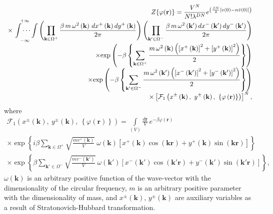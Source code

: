 \documentclass[aps,pre,preprint,floatfix,twoside,tightenlines,showpacs,
showkeys]{revtex4}
\begin{document}
\begin{equation}
\label{Z}
\begin{array}{r}
{\displaystyle 
Z{\left\{  \varphi(\mathbf{r})\right\} } = \frac{V^{N}}{N!\lambda^{DN}}e^{\left( \frac{\beta N}{2} \left[v(0) - n\tilde{v}(0) \right] \right)}
}\\
\times\ {\displaystyle 
\idotsint\limits_{-\infty}^{+\infty} \left(\prod_{\mathbf{k}\in\Omega^{+}} \frac{\beta\, m\, \omega^{2}\left(\mathbf{k}\right)\,dx^{+}\left(\mathbf{k}\right)dy^{+} \left(\mathbf{k}\right)}{2\pi}\right) \left(\prod_{\mathbf{k}'\in\Omega^{-}} \frac{\beta\, m\, \omega^{2}\left(\mathbf{k}'\right)dx^{-}\left(\mathbf{k}'\right)dy^{-} \left(\mathbf{k}'\right)}{2\pi}\right)
}\\
{\displaystyle 
\times {\exp\left(- \beta \left\{ \sum_{\mathbf{k}\in\Omega^+}\frac{ m\, \omega^{2}\left(\mathbf{k}\right)\left(\left[x^{+} \left(\mathbf{k}\right)\right]^{2} + \left[y^{+}\left(\mathbf{k}\right)\right]^{2}\right)}{2} \right\}\right)}
}\\
{\displaystyle 
\times {\exp\left(- \beta \left\{ \sum_{\mathbf{k}'\in\Omega^-}\frac{ m\, \omega^{2}\left(\mathbf{k}'\right)\left(\left[x^{-} \left(\mathbf{k}'\right)\right]^{2} + \left[y^{-}\left(\mathbf{k}'\right)\right]^{2}\right)}{2} \right\}\right)}
}\\ {\displaystyle \times
\left[\mathcal{F}_{1}\left(x^{\pm}\left(\mathbf{k}\right),\ y^{\pm}\left(\mathbf{k}\right),\ \left\{\varphi\left(\mathbf{r}\right)\right\}\right)\right]^{N}}\, ,
\end{array}
\end{equation}
where 
%
\begin{equation}
\label{Fu}
\begin{array}{r}
{\displaystyle 
\mathcal{F}_{1}\left(x^{\pm}\left(\mathbf{k}\right),\ y^{\pm}\left(\mathbf{k}\right),\ \left\{\varphi\left(\mathbf{r}\right)\right\}\right) = \int\limits_{(V)}\frac{d\mathbf{r}}{V}\, e^{{-}\beta\varphi\left(\mathbf{r}\right)}} \\
{\displaystyle 
\times\exp\left\{i\beta\sum_{\mathbf{k}\in\Omega^{+}} \sqrt{\frac{m v^{+}\left( \mathbf{k}\right)}{V}}\ \omega \left(\mathbf{k}\right) \left[x^{+}\left(\mathbf{k}\right) \cos\left(\mathbf{k}\mathbf{r}\right) + y^{+}\left(\mathbf{k}\right) \sin\left(\mathbf{k}\mathbf{r}\right)\right]\right\}} \\
{\displaystyle \times
\exp\left\{\beta\sum_{\mathbf{k}'\in\Omega^{-}}\sqrt{\frac{m v^{-}\left(\mathbf{k}'\right)}{V}}\ \omega\left(\mathbf{k}'\right) \left[x^{-}\left(\mathbf{k}'\right)\cos \left(\mathbf{k}'\mathbf{r}\right) + y^{-}\left(\mathbf{k}'\right) \sin\left(\mathbf{k}'\mathbf{r}\right)\right]\right\}},
\end{array}
\end{equation}
$\omega\left(\mathbf{k}\right)$ is an arbitrary positive function of the wave-vector with the dimensionality of the circular frequency, $m$ is an arbitrary positive parameter with the dimensionality of mass, and  $x^{\pm}\left(\mathbf{k}\right)$, $y^{\pm}\left(\mathbf{k}\right)$ are auxiliary  variables as a result of Stratonovich-Hubbard transformation.
\end{document}
